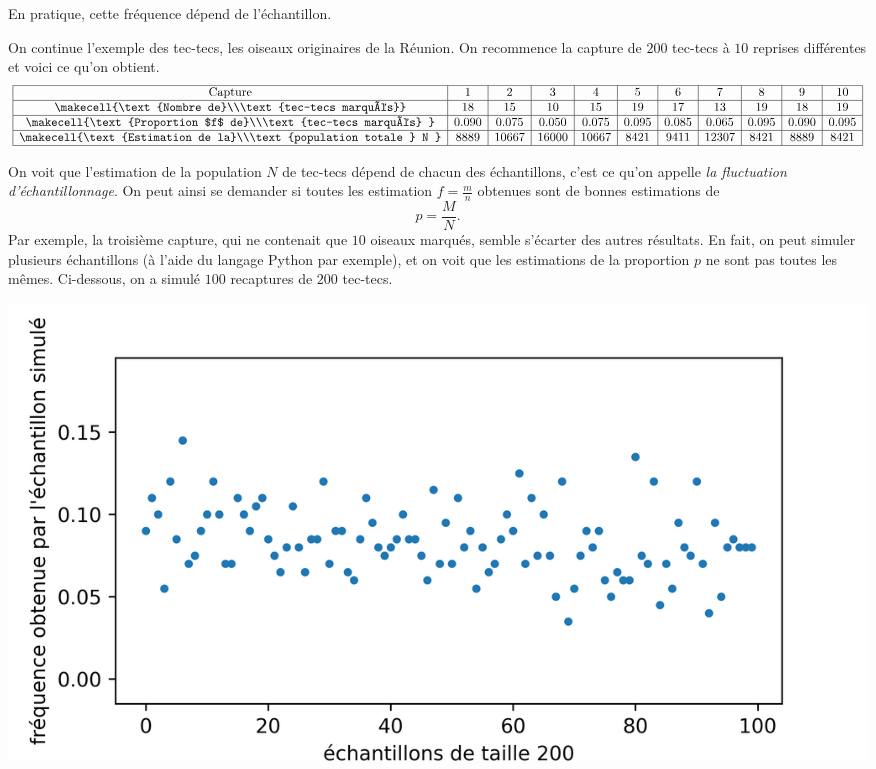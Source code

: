 \documentclass[11pt]{article}
\begin{document}
En pratique, cette fréquence dépend de l'échantillon.
\begin{exemple}
  On continue l'exemple des tec-tecs, les oiseaux originaires de la Réunion. On
  recommence la capture de $200$ tec-tecs à $10$ reprises différentes et voici
  ce qu'on obtient.
\[
  \begin{array}{|c|c|c|c|c|c|c|c|c|c|c|}
    \hline
    \text{Capture} & 1 & 2 & 3 & 4 & 5 & 6 & 7 & 8 & 9 & 10 \\
    \hline
    \makecell{\text{Nombre de}\\\text{tec-tecs marqués}} & 18 & 15 & 10 & 15 & 19 & 17 & 13 & 19 &
    18 & 19 \\
    \hline
    \makecell{\text{Proportion $f$ de}\\\text{tec-tecs marqués}
    } & 0.090  & 0.075 & 0.050 & 0.075 &
    0.095 & 0.085 & 0.065 & 0.095 & 0.090 & 0.095 \\
    \hline
    \makecell{\text{Estimation de la}\\\text{population totale } N
    } & 8889  & 10667 & 16000 & 10667 &
    8421 & 9411 & 12307 & 8421 & 8889 & 8421\\
    \hline
  \end{array}
\]
\end{exemple}
\noindent On voit que l'estimation de la population $N$ de tec-tecs dépend de chacun des
échantillons, c'est ce qu'on appelle \emph{la fluctuation d'échantillonnage}.
On peut ainsi se demander si toutes les estimation $f=\frac{m}{n}$ obtenues sont
de bonnes estimations de
\[
  p = \frac{M}{N}.
\]
Par exemple, la troisième capture, qui ne contenait que $10$ oiseaux marqués,
semble s'écarter des autres résultats. En fait, on peut simuler plusieurs
échantillons (à l'aide du langage Python par exemple), et on voit que les
estimations de la proportion $p$ ne sont pas toutes les mêmes. Ci-dessous, on a
simulé $100$ recaptures de $200$ tec-tecs.
\begin{center}
\includegraphics{simul200.png}
\end{center}
\end{document}
